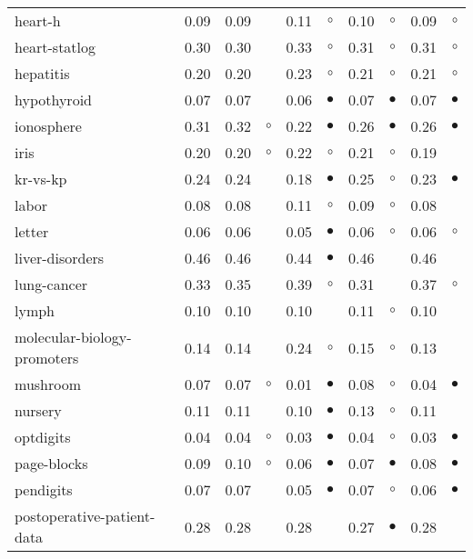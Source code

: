 {\begin{longtable}{lrr@{\hspace{0.1cm}}cr@{\hspace{0.1cm}}cr@{\hspace{0.1cm}}cr@{\hspace{0.1cm}}c}
heart-h & 0.09 & 0.09 &           & 0.11 &   $\circ$ & 0.10 &   $\circ$ & 0.09 &    $\circ$\\
heart-statlog & 0.30 & 0.30 &           & 0.33 &   $\circ$ & 0.31 &   $\circ$ & 0.31 &    $\circ$\\
hepatitis & 0.20 & 0.20 &           & 0.23 &   $\circ$ & 0.21 &   $\circ$ & 0.21 &    $\circ$\\
hypothyroid & 0.07 & 0.07 &           & 0.06 & $\bullet$ & 0.07 & $\bullet$ & 0.07 &  $\bullet$\\
ionosphere & 0.31 & 0.32 &   $\circ$ & 0.22 & $\bullet$ & 0.26 & $\bullet$ & 0.26 &  $\bullet$\\
iris & 0.20 & 0.20 &   $\circ$ & 0.22 &   $\circ$ & 0.21 &   $\circ$ & 0.19 &           \\
kr-vs-kp & 0.24 & 0.24 &           & 0.18 & $\bullet$ & 0.25 &   $\circ$ & 0.23 &  $\bullet$\\
labor & 0.08 & 0.08 &           & 0.11 &   $\circ$ & 0.09 &   $\circ$ & 0.08 &           \\
letter & 0.06 & 0.06 &           & 0.05 & $\bullet$ & 0.06 &   $\circ$ & 0.06 &    $\circ$\\
liver-disorders & 0.46 & 0.46 &           & 0.44 & $\bullet$ & 0.46 &           & 0.46 &           \\
lung-cancer & 0.33 & 0.35 &           & 0.39 &   $\circ$ & 0.31 &           & 0.37 &    $\circ$\\
lymph & 0.10 & 0.10 &           & 0.10 &           & 0.11 &   $\circ$ & 0.10 &           \\
molecular-biology-promoters & 0.14 & 0.14 &           & 0.24 &   $\circ$ & 0.15 &   $\circ$ & 0.13 &           \\
mushroom & 0.07 & 0.07 &   $\circ$ & 0.01 & $\bullet$ & 0.08 &   $\circ$ & 0.04 &  $\bullet$\\
nursery & 0.11 & 0.11 &           & 0.10 & $\bullet$ & 0.13 &   $\circ$ & 0.11 &           \\
optdigits & 0.04 & 0.04 &   $\circ$ & 0.03 & $\bullet$ & 0.04 &   $\circ$ & 0.03 &  $\bullet$\\
page-blocks & 0.09 & 0.10 &   $\circ$ & 0.06 & $\bullet$ & 0.07 & $\bullet$ & 0.08 &  $\bullet$\\
pendigits & 0.07 & 0.07 &           & 0.05 & $\bullet$ & 0.07 &   $\circ$ & 0.06 &  $\bullet$\\
postoperative-patient-data & 0.28 & 0.28 &           & 0.28 &           & 0.27 & $\bullet$ & 0.28 &           \\

\end{longtable}}
